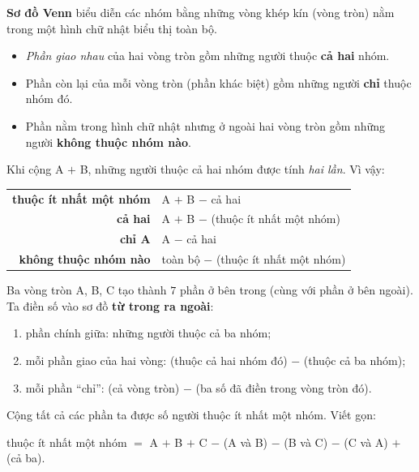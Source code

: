 \begin{knowbox}
\textbf{Sơ đồ Venn} biểu diễn các nhóm bằng những vòng khép kín (vòng tròn) nằm trong một hình chữ nhật biểu thị toàn bộ.
\begin{center}
\end{center}
\begin{itemize}[leftmargin=1.4em,itemsep=3pt]
\item \emph{Phần giao nhau} của hai vòng tròn gồm những người thuộc \textbf{cả hai} nhóm.
\item Phần còn lại của mỗi vòng tròn (phần khác biệt) gồm những người \textbf{chỉ} thuộc nhóm đó.
\item Phần nằm trong hình chữ nhật nhưng ở ngoài hai vòng tròn gồm những người \textbf{không thuộc nhóm nào}.
\end{itemize}
Khi cộng A $+$ B, những người thuộc cả hai nhóm được tính \emph{hai lần}. Vì vậy:
\begin{center}
\renewcommand{\arraystretch}{1.3}
\begin{tabular}{@{}r@{\ $=$\ }l@{}}
\textbf{thuộc ít nhất một nhóm} & A $+$ B $-$ cả hai\\
\textbf{cả hai} & A $+$ B $-$ (thuộc ít nhất một nhóm)\\
\textbf{chỉ A} & A $-$ cả hai\\
\textbf{không thuộc nhóm nào} & toàn bộ $-$ (thuộc ít nhất một nhóm)\\
\end{tabular}
\end{center}
\end{knowbox}
\begin{knowbox}
Ba vòng tròn A, B, C tạo thành $7$ phần ở bên trong (cùng với phần ở bên ngoài). Ta điền số vào sơ đồ \textbf{từ trong ra ngoài}:
\begin{enumerate}[leftmargin=1.6em,itemsep=2pt]
\item phần chính giữa: những người thuộc cả ba nhóm;
\item mỗi phần giao của hai vòng: (thuộc cả hai nhóm đó) $-$ (thuộc cả ba nhóm);
\item mỗi phần ``chỉ'': (cả vòng tròn) $-$ (ba số đã điền trong vòng tròn đó).
\end{enumerate}
Cộng tất cả các phần ta được số người thuộc ít nhất một nhóm. Viết gọn:
\begin{center}
thuộc ít nhất một nhóm $=$ A $+$ B $+$ C $-$ (A và B) $-$ (B và C) $-$ (C và A) $+$ (cả ba).
\end{center}
\end{knowbox}

